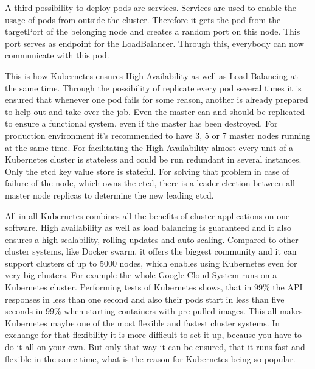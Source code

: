 A third possibility to deploy pods are services. Services are used to enable the usage of pods from outside the cluster. Therefore it gets the pod from the targetPort of the belonging node and creates a random port on this node. This port serves as endpoint for the LoadBalancer. Through this, everybody can now communicate with this pod.

This is how Kubernetes ensures High Availability as well as Load Balancing at the same time. Through the possibility of replicate every pod several times it is ensured that whenever one pod fails for some reason, another is already prepared to help out and take over the job. Even the master can and should be replicated to ensure a functional system, even if the master has been destroyed. For production environment it's recommended to have 3, 5 or 7 master nodes running at the same time. For facilitating the High Availability almost every unit of a Kubernetes cluster is stateless and could be run redundant in several instances. Only the etcd key value store is stateful. For solving that problem in case of failure of the node, which owns the etcd, there is a leader election between all master node replicas to determine the new leading etcd. 


All in all Kubernetes combines all the benefits of cluster applications on one software. High availability as well as load balancing is guaranteed and it also ensures a high scalability, rolling updates and auto-scaling. Compared to other cluster systems, like Docker swarm, it offers the biggest community and it can support clusters of up to 5000 nodes, which enables using Kubernetes even for very big clusters. For example the whole Google Cloud System runs on a Kubernetes cluster. Performing tests of Kubernetes shows, that in 99\% the API responses in less than one second and also their pods start in less than five seconds in 99\% when starting containers with pre pulled images. This all makes Kubernetes maybe one of the most flexible and fastest cluster systems. In exchange for that flexibility it is more difficult to set it up, because you have to do it all on your own. But only that way it can be ensured, that it runs fast and flexible in the same time, what is the reason for Kubernetes being so popular. 


